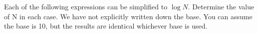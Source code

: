 \question Each of the following expressions can be simplified to $\log N$.
Determine the value of N in each case. 
We have not explicitly written down the base. 
You can assume the base is 10, but the results are identical whichever 
base is used.
\begin{multicols}{3}
\end{multicols}
